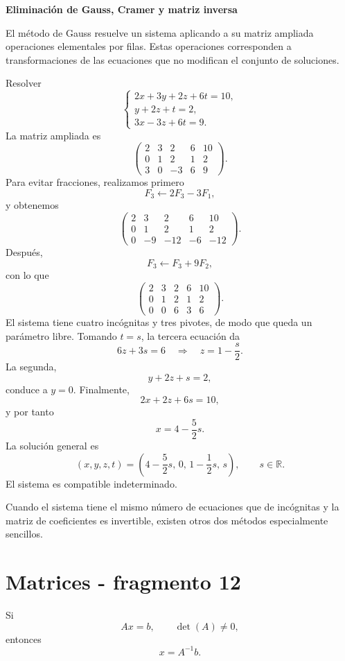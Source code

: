 \textbf{Eliminación de Gauss, Cramer y matriz inversa}

El método de Gauss resuelve un sistema aplicando a su matriz ampliada operaciones elementales por filas. Estas operaciones corresponden a transformaciones de las ecuaciones que no modifican el conjunto de soluciones.

\begin{example}
Resolver
\[
\begin{cases}
2x+3y+2z+6t=10,\\
y+2z+t=2,\\
3x-3z+6t=9.
\end{cases}
\]
La matriz ampliada es
\[
\left(
\begin{array}{cccc|c}
2&3&2&6&10\\
0&1&2&1&2\\
3&0&-3&6&9
\end{array}
\right).
\]
Para evitar fracciones, realizamos primero
\[
F_3\leftarrow2F_3-3F_1,
\]
y obtenemos
\[
\left(
\begin{array}{cccc|c}
2&3&2&6&10\\
0&1&2&1&2\\
0&-9&-12&-6&-12
\end{array}
\right).
\]
Después,
\[
F_3\leftarrow F_3+9F_2,
\]
con lo que
\[
\left(
\begin{array}{cccc|c}
2&3&2&6&10\\
0&1&2&1&2\\
0&0&6&3&6
\end{array}
\right).
\]
El sistema tiene cuatro incógnitas y tres pivotes, de modo que queda un parámetro libre. Tomando $t=s$, la tercera ecuación da
\[
6z+3s=6
\quad\Longrightarrow\quad
z=1-\frac{s}{2}.
\]
La segunda,
\[
y+2z+s=2,
\]
conduce a $y=0$. Finalmente,
\[
2x+2z+6s=10,
\]
y por tanto
\[
x=4-\frac52s.
\]
La solución general es
\[
\boxed{(x,y,z,t)=\left(4-\frac52s,\,0,\,1-\frac12s,\,s\right),\qquad s\in\mathbb{R}.}
\]
El sistema es compatible indeterminado.
\end{example}

Cuando el sistema tiene el mismo número de ecuaciones que de incógnitas y la matriz de coeficientes es invertible, existen otros dos métodos especialmente sencillos.


\section{Matrices - fragmento 12}
Si
\[
Ax=b,
\qquad \det(A)\neq0,
\]
entonces
\[
\boxed{x=A^{-1}b.}
\]

